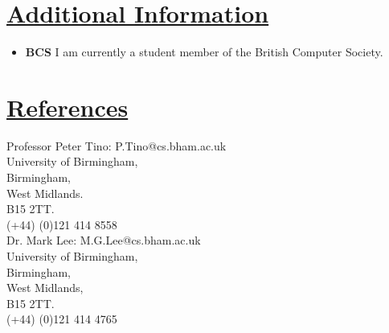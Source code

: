 \documentclass[11pt]{article}
\begin{document}
	\vspace{-20pt}
	\hspace{-100pt}\section*{\underline{Additional Information}}
		\begin{itemize}
			\item \textbf{BCS} I am currently a student member of the British Computer Society.
		\end{itemize}

				
	\vspace{-20pt}
	\hspace{-100pt}\section*{\underline{References}}	
				\begin{multicols}{2}
					\noindent
					Professor Peter Tino:  P.Tino@cs.bham.ac.uk  \\
					University of Birmingham,\\
					Birmingham, \\
					West Midlands.\\
					B15 2TT.\\
					(+44) (0)121 414 8558\\
	
					\noindent
					Dr. Mark Lee: M.G.Lee@cs.bham.ac.uk\\
					University of Birmingham,\\
					Birmingham,\\
					West Midlands,\\
					B15 2TT.\\
					(+44) (0)121 414 4765\\
				\end{multicols}
\end{document}

